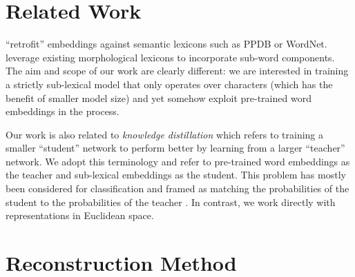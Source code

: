 \documentclass[11pt,letterpaper,UTF8]{article}
\begin{document}
\begin{CJK}{UTF8}{gbsn}
\section{Related Work}
\label{sec:related-work}

 ``retrofit'' embeddings against semantic lexicons such as PPDB or WordNet.
 leverage existing morphological lexicons to incorporate sub-word components.
The aim and scope of our work are clearly different: we are interested in training a strictly sub-lexical model that only operates over characters
(which has the benefit of smaller model size) and yet somehow exploit pre-trained word embeddings in the process.

Our work is also related to \textit{knowledge distillation} which refers to
training a smaller ``student'' network to perform better by learning from a larger ``teacher'' network.
We adopt this terminology and refer to pre-trained word embeddings as the teacher and sub-lexical embeddings as the student.
This problem has mostly been considered for classification and framed as matching the probabilities of the student
to the probabilities of the teacher \cite{ba2014deep,li2014learning,kim2016sequence}.
In contrast, we work directly with representations in Euclidean space.


\section{Reconstruction Method}
\label{sec:reconstruct}


\end{CJK}
\end{document}
